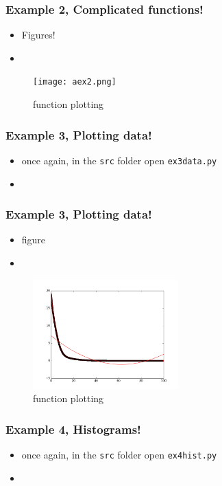 \documentclass{beamer}
\begin{document}
\begin{frame}
\frametitle{Example 2, Complicated functions!}
\begin{itemize}
\item Figures!
\item
\end{itemize}
\begin{figure}
	\centering
	\texttt{[image: aex2.png]}
	\caption{function plotting}
	\label{fig:function}
\end{figure}
\end{frame}


\begin{frame}
\frametitle{Example 3, Plotting data!}
\begin{itemize}
	\item once again, in the \texttt{src} folder open \texttt{ex3data.py}
	\item
\end{itemize}
\end{frame}

\begin{frame}
\frametitle{Example 3, Plotting data!}
\begin{itemize}
	\item figure 
	\item
\end{itemize}
\begin{figure}
	\centering
	\includegraphics[width=0.5\textwidth]{ex3.png}
	\caption{function plotting}
	\label{fig:function}
\end{figure}
\end{frame}

\begin{frame}
\frametitle{Example 4, Histograms!}
\begin{itemize}
\item once again, in the \texttt{src} folder open \texttt{ex4hist.py}
\item
\end{itemize}
\end{frame}
\end{document}

